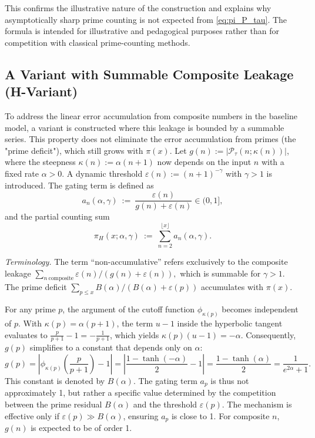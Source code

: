 This confirms the illustrative nature of the construction and explains why asymptotically sharp prime counting is not expected from \eqref{eq:pi_P_tau}. The formula is intended for illustrative and pedagogical purposes rather than for competition with classical prime-counting methods.

\subsection{A Variant with Summable Composite Leakage (H-Variant)}

To address the linear error accumulation from composite numbers in the baseline model, a variant is constructed where this leakage is bounded by a summable series. This property does not eliminate the error accumulation from primes (the "prime deficit"), which still grows with $\pi(x)$. Let $g(n):=|\mathcal P_\tau(n;\kappa(n))|$, where the steepness $\kappa(n):=\alpha(n+1)$ now depends on the input $n$ with a fixed rate $\alpha>0$. A dynamic threshold $\varepsilon(n):=(n+1)^{-\gamma}$ with $\gamma>1$ is introduced. The gating term is defined as
\[
a_n(\alpha,\gamma)\ :=\ \frac{\varepsilon(n)}{g(n)+\varepsilon(n)}\in(0,1],
\]
and the partial counting sum
\begin{equation}\label{eq:pi_H}
\pi_H(x;\alpha,\gamma)\ :=\ \sum_{n=2}^{\lfloor x\rfloor} a_n(\alpha,\gamma).
\end{equation}

\noindent\emph{Terminology.} The term “non-accumulative” refers exclusively to the composite leakage
\(
\sum_{n\ \mathrm{composite}} \varepsilon(n)/(g(n)+\varepsilon(n)),
\)
which is summable for $\gamma>1$. The prime deficit
\(
\sum_{p\le x} B(\alpha)/(B(\alpha)+\varepsilon(p))
\)
accumulates with $\pi(x)$.

For any prime $p$, the argument of the cutoff function $\phi_{\kappa(p)}$ becomes independent of $p$. With $\kappa(p)=\alpha(p+1)$, the term $u-1$ inside the hyperbolic tangent evaluates to $\frac{p}{p+1}-1 = -\frac{1}{p+1}$, which yields $\kappa(p)(u-1)=-\alpha$. Consequently, $g(p)$ simplifies to a constant that depends only on $\alpha$:
\[
g(p) = \left|\phi_{\kappa(p)}\!\left(\frac{p}{p+1}\right)-1\right| = \left|\frac{1-\tanh(-\alpha)}{2}-1\right| = \frac{1-\tanh(\alpha)}{2} = \frac{1}{e^{2\alpha}+1}.
\]
This constant is denoted by $B(\alpha)$. The gating term $a_p$ is thus not approximately 1, but rather a specific value determined by the competition between the prime residual $B(\alpha)$ and the threshold $\varepsilon(p)$. The mechanism is effective only if $\varepsilon(p) \gg B(\alpha)$, ensuring $a_p$ is close to 1. For composite $n$, $g(n)$ is expected to be of order 1.

